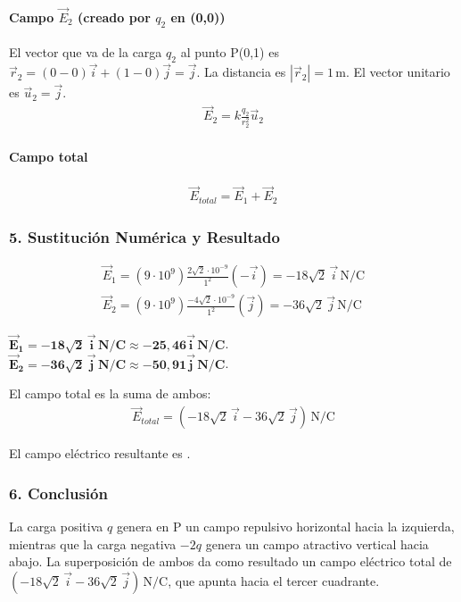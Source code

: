 \paragraph*{Campo $\vec{E}_2$ (creado por $q_2$ en (0,0))}
El vector que va de la carga $q_2$ al punto P(0,1) es $\vec{r}_2 = (0-0)\vec{i} + (1-0)\vec{j} = \vec{j}$.
La distancia es $|\vec{r}_2|=1\,\text{m}$. El vector unitario es $\vec{u}_2 = \vec{j}$.
\begin{gather}
    \vec{E}_2 = k \frac{q_2}{r_2^2} \vec{u}_2
\end{gather}
\paragraph*{Campo total}
\begin{gather}
    \vec{E}_{total} = \vec{E}_1 + \vec{E}_2
\end{gather}

\subsubsection*{5. Sustitución Numérica y Resultado}
\begin{gather}
    \vec{E}_1 = (9\cdot10^9) \frac{2\sqrt{2}\cdot10^{-9}}{1^2}(-\vec{i}) = -18\sqrt{2}\,\vec{i} \, \text{N/C} \\
    \vec{E}_2 = (9\cdot10^9) \frac{-4\sqrt{2}\cdot10^{-9}}{1^2}(\vec{j}) = -36\sqrt{2}\,\vec{j} \, \text{N/C}
\end{gather}
\begin{cajaresultado}
    $\boldsymbol{\vec{E}_1 = -18\sqrt{2}\,\vec{i} \, \textbf{N/C} \approx -25,46\vec{i} \, \textbf{N/C}}$. \\
    $\boldsymbol{\vec{E}_2 = -36\sqrt{2}\,\vec{j} \, \textbf{N/C} \approx -50,91\vec{j} \, \textbf{N/C}}$.
\end{cajaresultado}
El campo total es la suma de ambos:
\begin{gather}
    \vec{E}_{total} = (-18\sqrt{2}\,\vec{i} - 36\sqrt{2}\,\vec{j}) \, \text{N/C}
\end{gather}
\begin{cajaresultado}
    El campo eléctrico resultante es .
\end{cajaresultado}

\subsubsection*{6. Conclusión}
\begin{cajaconclusion}
La carga positiva $q$ genera en P un campo repulsivo horizontal hacia la izquierda, mientras que la carga negativa $-2q$ genera un campo atractivo vertical hacia abajo. La superposición de ambos da como resultado un campo eléctrico total de $(-18\sqrt{2}\,\vec{i} - 36\sqrt{2}\,\vec{j}) \, \text{N/C}$, que apunta hacia el tercer cuadrante.
\end{cajaconclusion}

